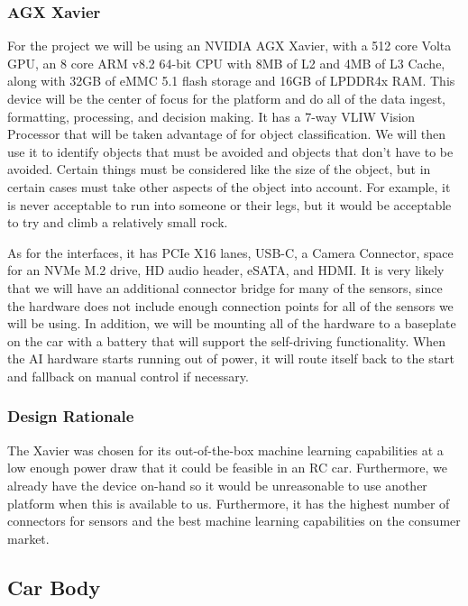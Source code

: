\documentclass[onecolumn, draftclsnofoot, 10pt, compsoc]{IEEEtran}
\begin{document}
\subsubsection{AGX Xavier}
For the project we will be using an NVIDIA AGX Xavier, with a 512 core Volta GPU, an 8 core ARM v8.2 64-bit CPU with 8MB of L2 and 4MB of L3 Cache, along with 32GB of eMMC 5.1 flash storage and 16GB of LPDDR4x RAM. This device will be the center of focus for the platform and do all of the data ingest, formatting, processing, and decision making. It has a 7-way VLIW Vision Processor that will be taken advantage of for object classification. We will then use it to identify objects that must be avoided and objects that don't have to be avoided. Certain things must be considered like the size of the object, but in certain cases must take other aspects of the object into account. For example, it is never acceptable to run into someone or their legs, but it would be acceptable to try and climb a relatively small rock.

As for the interfaces, it has PCIe X16 lanes, USB-C, a Camera Connector, space for an NVMe M.2 drive, HD audio header, eSATA, and HDMI. It is very likely that we will have an additional connector bridge for many of the sensors, since the hardware does not include enough connection points for all of the sensors we will be using. In addition, we will be mounting all of the hardware to a baseplate on the car with a battery that will support the self-driving functionality. When the AI hardware starts running out of power, it will route itself back to the start and fallback on manual control if necessary.

\subsubsection{Design Rationale}

The Xavier was chosen for its out-of-the-box machine learning capabilities at a low enough power draw that it could be feasible in an RC car. Furthermore, we already have the device on-hand so it would be unreasonable to use another platform when this is available to us. Furthermore, it has the highest number of connectors for sensors and the best machine learning capabilities on the consumer market.

\subsection{Car Body}
\end{document}
